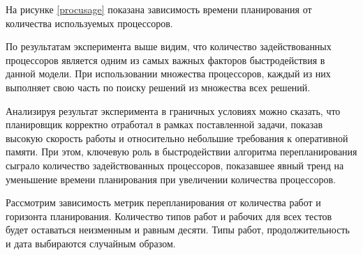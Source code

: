 На рисунке \ref{procusage} показана зависимость времени планирования от количества используемых процессоров.


По результатам эксперимента выше видим, что количество задействованных процессоров является одним из самых важных факторов быстродействия в данной модели. При использовании множества процессоров, каждый из них выполняет свою часть по поиску решений из множества всех решений.

Анализируя результат эксперимента в граничных условиях можно сказать, что планировщик корректно отработал в рамках поставленной задачи, показав высокую скорость работы и относительно небольшие требования к оперативной памяти. При этом, ключевую роль в быстродействии алгоритма перепланирования сыграло количество задействованных процессоров, показавшее явный тренд на уменьшение времени планирования при увеличении количества процессоров.

Рассмотрим зависимость метрик перепланирования от количества работ и горизонта планирования. Количество типов работ и рабочих для всех тестов будет оставаться неизменным и равным десяти. Типы работ, продолжительность и дата выбираются случайным образом.



\clearpage
